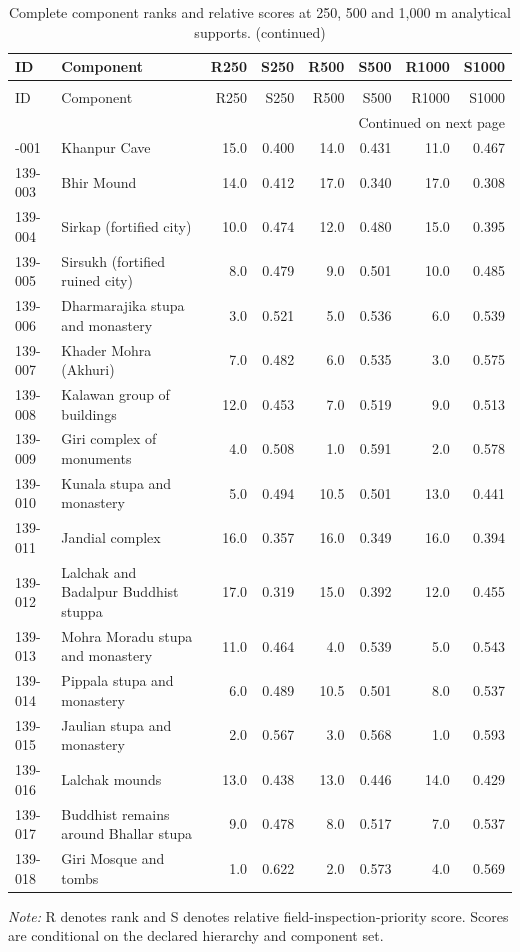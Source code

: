 \begingroup
\scriptsize
\setlength{\tabcolsep}{3pt}
\begin{longtable}{p{}p{}rrrrrr}
\caption{Complete component ranks and relative scores at 250, 500 and 1,000 m analytical supports.}\label{tab:s-component-ranks}\\
\toprule
ID & Component & R250 & S250 & R500 & S500 & R1000 & S1000 \\
\midrule
\endfirsthead
\caption[]{Complete component ranks and relative scores at 250, 500 and 1,000 m analytical supports. (continued)}\\
\toprule
ID & Component & R250 & S250 & R500 & S500 & R1000 & S1000 \\
\midrule
\endhead
\midrule
\multicolumn{8}{r}{Continued on next page}\\
\endfoot
\bottomrule
\endlastfoot
139-001 & Khanpur Cave & 15.0 & 0.400 & 14.0 & 0.431 & 11.0 & 0.467 \\
139-003 & Bhir Mound & 14.0 & 0.412 & 17.0 & 0.340 & 17.0 & 0.308 \\
139-004 & Sirkap (fortified city) & 10.0 & 0.474 & 12.0 & 0.480 & 15.0 & 0.395 \\
139-005 & Sirsukh (fortified ruined city) & 8.0 & 0.479 & 9.0 & 0.501 & 10.0 & 0.485 \\
139-006 & Dharmarajika stupa and monastery & 3.0 & 0.521 & 5.0 & 0.536 & 6.0 & 0.539 \\
139-007 & Khader Mohra (Akhuri) & 7.0 & 0.482 & 6.0 & 0.535 & 3.0 & 0.575 \\
139-008 & Kalawan group of buildings & 12.0 & 0.453 & 7.0 & 0.519 & 9.0 & 0.513 \\
139-009 & Giri complex of monuments & 4.0 & 0.508 & 1.0 & 0.591 & 2.0 & 0.578 \\
139-010 & Kunala stupa and monastery & 5.0 & 0.494 & 10.5 & 0.501 & 13.0 & 0.441 \\
139-011 & Jandial complex & 16.0 & 0.357 & 16.0 & 0.349 & 16.0 & 0.394 \\
139-012 & Lalchak and Badalpur Buddhist stuppa & 17.0 & 0.319 & 15.0 & 0.392 & 12.0 & 0.455 \\
139-013 & Mohra Moradu stupa and monastery & 11.0 & 0.464 & 4.0 & 0.539 & 5.0 & 0.543 \\
139-014 & Pippala stupa and monastery & 6.0 & 0.489 & 10.5 & 0.501 & 8.0 & 0.537 \\
139-015 & Jaulian stupa and monastery & 2.0 & 0.567 & 3.0 & 0.568 & 1.0 & 0.593 \\
139-016 & Lalchak mounds & 13.0 & 0.438 & 13.0 & 0.446 & 14.0 & 0.429 \\
139-017 & Buddhist remains around Bhallar stupa & 9.0 & 0.478 & 8.0 & 0.517 & 7.0 & 0.537 \\
139-018 & Giri Mosque and tombs & 1.0 & 0.622 & 2.0 & 0.573 & 4.0 & 0.569 \\
\end{longtable}
\noindent\textit{Note:} R denotes rank and S denotes relative field-inspection-priority score. Scores are conditional on the declared hierarchy and component set.
\endgroup
